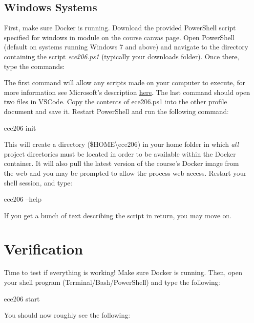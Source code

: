 \documentclass[11pt, letterpaper, titlepage, oneside]{memoir}
\begin{document}
        \subsection*{Windows Systems}
            First, make sure Docker is running. Download the provided PowerShell script specified for windows in module on the course canvas page. Open PowerShell (default on systems running Windows 7 and above) and navigate to the directory containing the script \textit{ece206.ps1} (typically your downloads folder). Once there, type the commands:
            The first command will allow any scripts made on your computer to execute, for more information see Microsoft's description \href{https://docs.microsoft.com/en-us/powershell/module/microsoft.powershell.security/set-executionpolicy?view=powershell-7.1}{here}. The last command should open two files in VSCode. Copy the contents of ece206.ps1 into the other profile document and save it. Restart PowerShell and run the following command:
            \begin{bash}
                ece206 init
            \end{bash}
            This will create a directory (\$HOME\textbackslash ece206) in your home folder in which \textit{all} project directories must be located in order to be available within the Docker container. It will also pull the latest version of the course's Docker image from the web and you may be prompted to allow the process web access. Restart your shell session, and type:
            \begin{bash}
                ece206 --help
            \end{bash}
            If you get a bunch of text describing the script in return, you may move on.

    \section*{Verification}
        Time to test if everything is working! Make sure Docker is running. Then, open your shell program (Terminal/Bash/PowerShell) and type the following:
        \begin{bash}
            ece206 start
        \end{bash}
        You should now roughly see the following:
\end{document}
